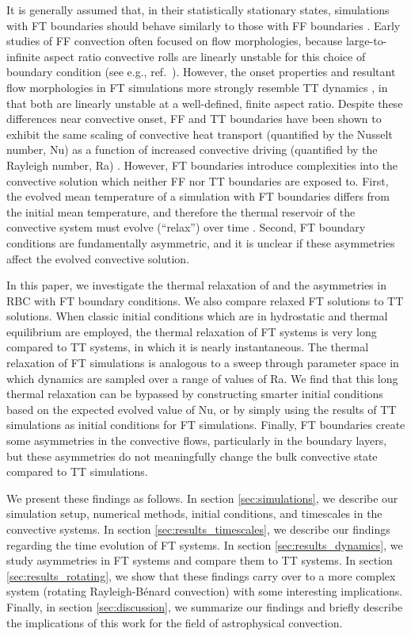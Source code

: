 \documentclass[aps, pre, onecolumn, nofootinbib, notitlepage, groupedaddress, amsfonts, amssymb, amsmath, longbibliography, superscriptaddress]{revtex4-1}
\newcommand{\RB}{Rayleigh-B\'{e}nard }
\newcommand{\ea}[1]{{\color{red} #1}}
\begin{document}
It is generally assumed that, \ea{in their statistically stationary states, simulations with} FT boundaries should behave similarly to \ea{those with} FF boundaries \cite{goluskin2016, otero&all2002}.
\ea{Early studies of FF convection often focused on flow morphologies, because large-to-infinite aspect ratio convective rolls are linearly unstable for this choice of boundary condition (see e.g., ref.~\cite{chapman&proctor1980}).
However, the onset properties and resultant flow morphologies in FT simulations more strongly resemble TT dynamics \cite{ishiwatari&all1994}, in that both are linearly unstable at a well-defined, finite aspect ratio.}
\ea{Despite these differences near convective onset,} FF and TT boundaries \ea{have been shown to} exhibit the same scaling of convective heat transport (quantified by the Nusselt number, Nu) as a function of increased convective driving (quantified by the Rayleigh number, Ra) \cite{johnston&doering2009}.
However, FT boundaries introduce complexities into the convective solution which neither FF nor TT boundaries are exposed to.
First, the evolved mean temperature of a simulation with FT boundaries differs from the initial mean temperature, and therefore the thermal reservoir of the convective system must evolve (``relax'') over time \cite{anders&all2018}.
Second, FT boundary conditions are fundamentally asymmetric, and it is unclear if these asymmetries affect the evolved convective solution.

In this paper, we investigate the thermal relaxation of and the asymmetries in RBC with FT boundary conditions.
We also compare relaxed FT solutions to TT solutions.
\ea{When classic initial conditions which are in hydrostatic and thermal equilibrium are employed,} the thermal relaxation of FT systems is very long compared to TT systems, in which it is nearly instantaneous.
The thermal relaxation of FT simulations is analogous to a sweep through parameter space in which dynamics are sampled over a range of values of Ra.
We find that this long thermal relaxation can be bypassed by \ea{constructing smarter initial conditions based on the expected evolved value of Nu, or by simply} using the results of TT simulations as initial conditions for FT simulations.
Finally, FT boundaries create some asymmetries in the convective flows, \ea{particularly in the boundary layers,} but these asymmetries do not meaningfully change the \ea{bulk} convective state compared to TT simulations.

We present these findings as follows.
In section \ref{sec:simulations}, we describe our simulation setup, numerical methods, \ea{initial conditions, and timescales in the convective systems}.
In section \ref{sec:results_timescales}, we describe our findings \ea{regarding} the time evolution of FT systems.
\ea{In section \ref{sec:results_dynamics}, we study asymmetries in FT systems and compare them to TT systems.}
In section \ref{sec:results_rotating}, we show that these findings carry over to a more complex system (rotating \RB convection) with some interesting implications.
Finally, in section \ref{sec:discussion}, we summarize our findings and briefly describe the implications of this work for the field of astrophysical convection.
\end{document}
